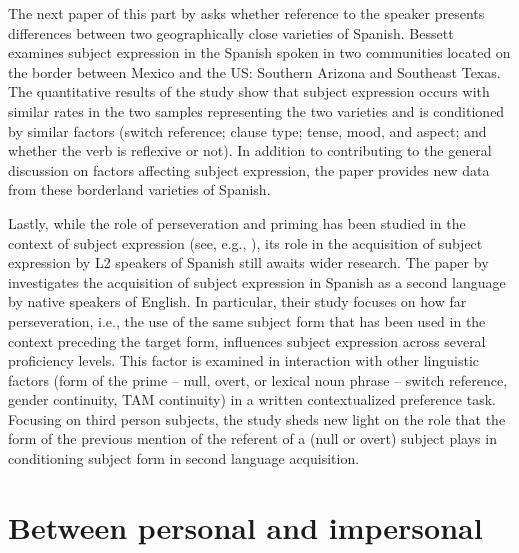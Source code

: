 \documentclass[output=paper]{langscibook}
\begin{document}
The next paper of this part by  asks whether reference to the speaker presents differences between two geographically close varieties of Spanish. Bessett examines  subject expression in the Spanish spoken in two communities located on the border between Mexico and the US: Southern Arizona and Southeast Texas. The quantitative results of the study show that  subject expression occurs with similar rates in the two samples representing the two varieties and is conditioned by similar factors (switch reference; clause type; tense, mood, and aspect; and whether the verb is reflexive or not). In addition to contributing to the general discussion on factors affecting subject expression, the paper provides new data from these borderland varieties of Spanish.



Lastly, while the role of perseveration and priming has been studied in the context of subject expression (see, e.g., \citealt{TravisCacoullos2018}), its role in the acquisition of subject expression by L2 speakers of Spanish still awaits wider research. The paper by  investigates the acquisition of subject expression in Spanish as a second language by native speakers of English. In particular, their study focuses on how far perseveration, i.e., the use of the same subject form that has been used in the context preceding the target form, influences subject expression across several proficiency levels. This factor is examined in interaction with other linguistic factors (form of the prime – null, overt, or lexical noun phrase – switch reference, gender continuity, TAM continuity) in a written contextualized preference task. Focusing on third person subjects, the study sheds new light on the role that the form of the previous mention of the referent of a (null or overt) subject plays in conditioning subject form in second language acquisition.


\section{Between personal and impersonal}
\end{document}
